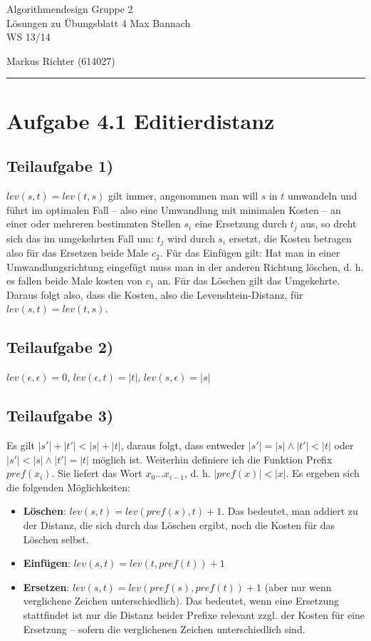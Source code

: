 \documentclass[a4paper, fontsize=10pt]{scrartcl}
\begin{document}
 

{\large Algorithmendesign \hfill Gruppe 2}\\  
{\large Lösungen zu Übungsblatt 4} \hfill Max Bannach\\
{\large WS 13/14}
\begin{flushright}Markus Richter (614027)\end{flushright}
\rule{\textwidth}{.3mm}

\section*{Aufgabe 4.1 Editierdistanz}
\subsection*{Teilaufgabe 1)}

$lev(s,t)=lev(t,s)$ gilt immer, angenommen man will $s$ in $t$ umwandeln und führt im optimalen Fall -- also eine Umwandlung mit minimalen Kosten -- an einer oder mehreren bestimmten Stellen $s_i$ eine Ersetzung durch $t_j$ aus, so dreht sich das im umgekehrten Fall um: $t_j$ wird durch $s_i$ ersetzt, die Kosten betragen also für das Ersetzen beide Male $c_2$. Für das Einfügen gilt: Hat man in einer Umwandlungsrichtung eingefügt muss man in der anderen Richtung löschen, d. h. es fallen beide Male kosten von $c_1$ an. Für das Löschen gilt das Umgekehrte. Daraus folgt also, dass die Kosten, also die Levenshtein-Distanz, für $lev(s,t)=lev(t,s) $.

\subsection*{Teilaufgabe 2)}
$lev(\epsilon,\epsilon)=0 $, $lev(\epsilon,t)=|t|$, $lev(s,\epsilon)=|s|$

\subsection*{Teilaufgabe 3)}
Es gilt $|s'|+|t'|<|s|+|t|$, daraus folgt, dass entweder $|s'|=|s| \wedge |t'|<|t|$ oder $|s'|<|s|\wedge |t'|=|t|$ möglich ist. Weiterhin definiere ich die Funktion Prefix $pref(x_i)$. Sie liefert das Wort $x_0...x_{i-1}$, d. h. $|pref(x)|<|x|$. Es ergeben sich die folgenden Möglichkeiten:

\begin{itemize}
  \item \textbf{Löschen}: $lev(s,t)=lev(pref(s),t)+1$. Das bedeutet, man addiert zu der Distanz, die sich durch das Löschen ergibt, noch die Kosten für das Löschen selbst.
  \item \textbf{Einfügen}: $lev(s,t)=lev(t,pref(t))+1$ 
  \item \textbf{Ersetzen}: $lev(s,t)=lev(pref(s),pref(t))+1$ (aber nur wenn verglichene Zeichen unterschiedlich). Das bedeutet, wenn eine Ersetzung stattfindet ist nur die Distanz beider Prefixe relevant zzgl. der Kosten für eine Ersetzung -- sofern die verglichenen Zeichen unterschiedlich sind.
\end{itemize}
\end{document}
